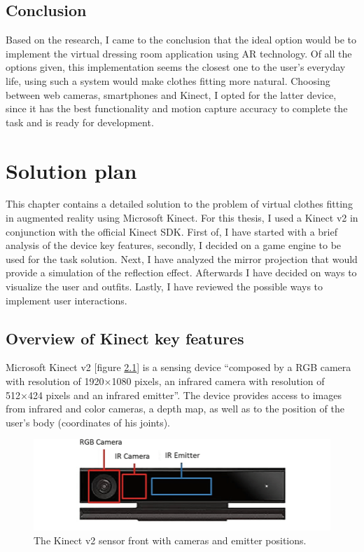 \documentclass[a4paper]{report}
\begin{document}
\section{Conclusion}
\qquad Based on the research, I came to the conclusion that the ideal option would be to implement the virtual dressing room application using AR technology. Of all the options given, this implementation seems the closest one to the user's everyday life, using such a system would make clothes fitting more natural. Choosing between web cameras, smartphones and Kinect, I opted for the latter device, since it has the best functionality and motion capture accuracy to complete the task and is ready for development.



\chapter{Solution plan}
\label{chapter_solutionPlan}
\qquad This chapter contains a detailed solution to the problem of virtual clothes fitting in augmented reality using Microsoft Kinect. For this thesis, I used a Kinect v2 in conjunction with the official Kinect SDK\cite{KinectSDKv2}. 
First of, I have started with a brief analysis of the device key features, secondly, I decided on a game engine to be used for the task solution. Next, I have analyzed the mirror projection that would provide a simulation of the reflection effect. Afterwards I have decided on ways to visualize the user and outfits. Lastly, I have reviewed the possible ways to implement user interactions.


\section{Overview of Kinect key features}
\label{section_Kinect}
\qquad Microsoft Kinect v2 [figure \ref{fig:kinecteSensors}] is a sensing device “composed by a RGB camera with resolution of 1920×1080 pixels, an infrared camera with resolution of 512×424 pixels and an infrared emitter”\cite{kinectV2VisionSystem}. The device provides access to images from infrared and color cameras, a depth map, as well as to the position of the user's body (coordinates of his joints).
\begin{figure}[H]
  \includegraphics[width=\textwidth, keepaspectratio]{images/Kinect_sensors.png}
  \caption{The Kinect v2 sensor front with cameras and emitter positions\cite{kinectV2VisionSystem}.}
  \label{fig:kinecteSensors}
\end{figure}
\end{document}
